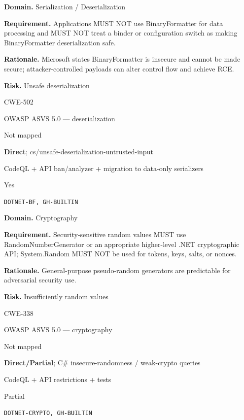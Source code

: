 \documentclass[10pt,letterpaper]{article}
\newcommand{\prioritybadge}[2]{\tcbox[on line,boxrule=0pt,arc=1.2mm,boxsep=0.7mm,left=1mm,right=1mm,top=0.4mm,bottom=0.4mm,colback=#2!12,coltext=#2]{\scriptsize\bfseries #1}}
\begin{document}
\begin{rulebox}[title={\texttt{SCS-CSHARP-DESER-001} \hfill \prioritybadge{Critical Control}{Critical}}]
\textbf{Domain.} Serialization / Deserialization

\textbf{Requirement.} Applications MUST NOT use BinaryFormatter for data processing and MUST NOT treat a binder or configuration switch as making BinaryFormatter deserialization safe.

\textbf{Rationale.} Microsoft states BinaryFormatter is insecure and cannot be made secure; attacker-controlled payloads can alter control flow and achieve RCE.

\textbf{Risk.} Unsafe deserialization

\begin{description}[leftmargin=2.65cm,labelwidth=2.3cm,style=nextline,itemsep=1pt,topsep=3pt]
  \item[CWE] CWE-502
  \item[OWASP] OWASP ASVS 5.0 --- deserialization
  \item[CERT] Not mapped
  \item[CodeQL] \textbf{Direct}; cs/unsafe-deserialization-untrusted-input
  \item[Enforcement] CodeQL + API ban/analyzer + migration to data-only serializers
  \item[Automation] Yes
  \item[Sources] \texttt{DOTNET-BF, GH-BUILTIN}
\end{description}
\end{rulebox}

\begin{rulebox}[title={\texttt{SCS-CSHARP-CRYPTO-001} \hfill \prioritybadge{Critical Control}{Critical}}]
\textbf{Domain.} Cryptography

\textbf{Requirement.} Security-sensitive random values MUST use RandomNumberGenerator or an appropriate higher-level .NET cryptographic API; System.Random MUST NOT be used for tokens, keys, salts, or nonces.

\textbf{Rationale.} General-purpose pseudo-random generators are predictable for adversarial security use.

\textbf{Risk.} Insufficiently random values

\begin{description}[leftmargin=2.65cm,labelwidth=2.3cm,style=nextline,itemsep=1pt,topsep=3pt]
  \item[CWE] CWE-338
  \item[OWASP] OWASP ASVS 5.0 --- cryptography
  \item[CERT] Not mapped
  \item[CodeQL] \textbf{Direct/Partial}; C\# insecure-randomness / weak-crypto queries
  \item[Enforcement] CodeQL + API restrictions + tests
  \item[Automation] Partial
  \item[Sources] \texttt{DOTNET-CRYPTO, GH-BUILTIN}
\end{description}
\end{rulebox}
\end{document}
